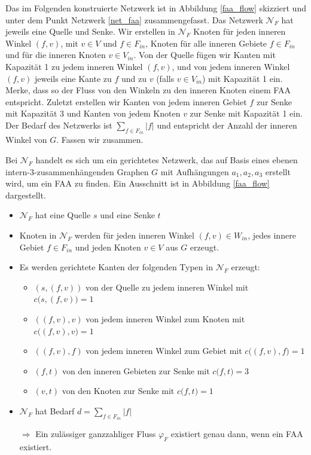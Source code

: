 Das im Folgenden konstruierte Netzwerk ist in Abbildung \ref{faa_flow} skizziert und unter dem Punkt Netzwerk \ref{net_faa} zusammengefasst. Das Netzwerk $\mathcal{N}_F$ hat jeweils eine Quelle und Senke. Wir erstellen in $\mathcal{N}_F$ Knoten für jeden inneren Winkel $(f,v)$, mit $v\in V$ und $f \in F_{in}$, Knoten für alle inneren Gebiete $f \in F_{in}$ und für die inneren Knoten $v\in V_{in}$. Von der Quelle fügen wir Kanten mit Kapazität 1 zu jedem inneren Winkel $(f,v)$, und von jedem inneren Winkel $(f,v)$ jeweils eine Kante zu $f$ und zu $v$ (falls $v\in V_{in}$) mit Kapazität 1 ein. Merke, dass so der Fluss von den Winkeln zu den inneren Knoten einem FAA entspricht. Zuletzt erstellen wir Kanten von jedem inneren Gebiet $f$ zur Senke mit Kapazität 3 und Kanten von jedem Knoten $v$ zur Senke mit Kapazität 1 ein. Der Bedarf des Netzwerks ist $\sum_{f \in F_{in}}|f|$ und entspricht der Anzahl der inneren Winkel von $G$. Fassen wir zusammen.

\begin{network}[FAA]\label{net_faa}
Bei $\mathcal{N}_F$ handelt es sich um ein gerichtetes Netzwerk, das auf Basis eines ebenen intern-3-zusammenhängenden Graphen $G$ mit Aufhängungen $a_1,a_2,a_3$ erstellt wird, um ein FAA zu finden. Ein Ausschnitt ist in Abbildung \ref{faa_flow} dargestellt.
	\begin{itemize}
	\item $\mathcal{N}_F$ hat eine Quelle $s$ und eine Senke $t$
	\item Knoten in $\mathcal{N}_F$ werden für jeden inneren Winkel $(f,v) \in W_{in}$, jedes innere Gebiet $f\in F_{in}$ und jeden Knoten $v \in V$ aus $G$ erzeugt.
	\item Es werden gerichtete Kanten der folgenden Typen in $\mathcal{N}_F$ erzeugt:
		\begin{itemize}
		\item $(s,(f,v))$ von der Quelle zu jedem inneren Winkel mit $c\big(s,(f,v)\big) = 1$
		\item $((f,v),v)$ von jedem inneren Winkel zum Knoten mit $c\big((f,v),v\big) = 1$
		\item $((f,v),f)$ von jedem inneren Winkel zum Gebiet mit $c\big((f,v),f\big) = 1$
		\item $(f,t)$ von den inneren Gebieten zur Senke mit $c\big(f,t\big) = 3$
		\item $(v,t)$ von den Knoten zur Senke mit $c\big(f,t\big) = 1$
		\end{itemize}
	\item $\mathcal{N}_F$ hat Bedarf $d=\sum_{f \in F_{in}}|f|$
	\item [$\Rightarrow$]Ein zulässiger ganzzahliger Fluss $\varphi_F$ existiert genau dann, wenn ein FAA existiert.
	\end{itemize}
\end{network}

